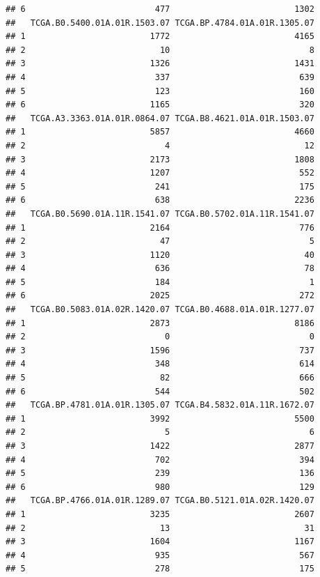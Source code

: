 \documentclass[
]{article}
\begin{document}
\begin{verbatim}
## 6                          477                         1302
##   TCGA.B0.5400.01A.01R.1503.07 TCGA.BP.4784.01A.01R.1305.07
## 1                         1772                         4165
## 2                           10                            8
## 3                         1326                         1431
## 4                          337                          639
## 5                          123                          160
## 6                         1165                          320
##   TCGA.A3.3363.01A.01R.0864.07 TCGA.B8.4621.01A.01R.1503.07
## 1                         5857                         4660
## 2                            4                           12
## 3                         2173                         1808
## 4                         1207                          552
## 5                          241                          175
## 6                          638                         2236
##   TCGA.B0.5690.01A.11R.1541.07 TCGA.B0.5702.01A.11R.1541.07
## 1                         2164                          776
## 2                           47                            5
## 3                         1120                           40
## 4                          636                           78
## 5                          184                            1
## 6                         2025                          272
##   TCGA.B0.5083.01A.02R.1420.07 TCGA.B0.4688.01A.01R.1277.07
## 1                         2873                         8186
## 2                            0                            0
## 3                         1596                          737
## 4                          348                          614
## 5                           82                          666
## 6                          544                          502
##   TCGA.BP.4781.01A.01R.1305.07 TCGA.B4.5832.01A.11R.1672.07
## 1                         3992                         5500
## 2                            5                            6
## 3                         1422                         2877
## 4                          702                          394
## 5                          239                          136
## 6                          980                          129
##   TCGA.BP.4766.01A.01R.1289.07 TCGA.B0.5121.01A.02R.1420.07
## 1                         3235                         2607
## 2                           13                           31
## 3                         1604                         1167
## 4                          935                          567
## 5                          278                          175

\end{verbatim}
\end{document}
